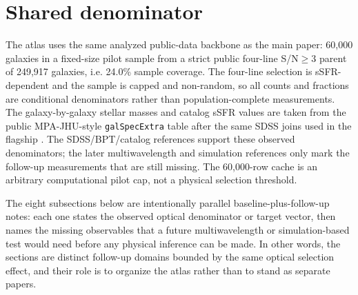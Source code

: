 \documentclass[twocolumn]{aastex631}
\begin{document}
\section{Shared denominator}
The atlas uses the same analyzed public-data backbone as the main paper: 60,000 galaxies in a fixed-size pilot sample from a strict public four-line S/N$\geq3$ parent of 249,917 galaxies, i.e. 24.0\% sample coverage. The four-line selection is sSFR-dependent and the sample is capped and non-random, so all counts and fractions are conditional denominators rather than population-complete measurements. The galaxy-by-galaxy stellar masses and catalog sSFR values are taken from the public MPA-JHU-style \texttt{galSpecExtra} table after the same SDSS joins used in the flagship \citep{sdssdr17,brinchmann2004,york2000}. The SDSS/BPT/catalog references support these observed denominators; the later multiwavelength and simulation references only mark the follow-up measurements that are still missing. The 60,000-row cache is an arbitrary computational pilot cap, not a physical selection threshold.

The eight subsections below are intentionally parallel baseline-plus-follow-up notes: each one states the observed optical denominator or target vector, then names the missing observables that a future multiwavelength or simulation-based test would need before any physical inference can be made. In other words, the sections are distinct follow-up domains bounded by the same optical selection effect, and their role is to organize the atlas rather than to stand as separate papers.
\end{document}
